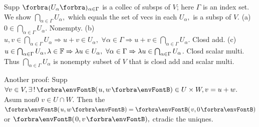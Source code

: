 Supp $\Bra{U_{\alpha}}{_{\alpha\in\Gamma}}$ is a collec of subsps of $V$; here $\Gamma$ is an index set.\vspace{2pt}\parSol{}
We show $\bigcap_{\alpha\in\Gamma}U_\alpha,$ which equals the set of vecs in each $U_\alpha,$ is a subsp of $V$.\vspace{2pt}\parSol{}
(a) $0\in\bigcap_{\alpha\in\Gamma}U_\alpha.$ Nonempty.\parSol{}
(b) $u,v\in\bigcap_{\alpha\in\Gamma}U_\alpha\Rightarrow u+v\in U_\alpha,\,\,\forall\alpha\in\Gamma\Rightarrow u+v\in\bigcap_{\alpha\in\Gamma}U_\alpha$. Closd add.\parSol{}
(c) $u\in\bigcap_{\alpha\in\Gamma}U_\alpha,\lambda\in{\mathbb{F}}\Rightarrow\lambda u\in U_\alpha,\,\,\forall\alpha\in\Gamma\Rightarrow\lambda u\in\bigcap_{\alpha\in\Gamma}U_\alpha$. Closd scalar multi.\vspace{4pt}\parSol{}
Thus $\bigcap_{\alpha\in\Gamma}U_\alpha$ is nonempty subset of $V$ that is closd add and scalar multi.\PfEnd
\SepLine\pagebreak

\BulletPointX\NoteForSmall{[1.45]}\;\;Another proof: Supp $\forall v\in V,\exists\,!\,\Par{u,w}\in U\times W,v=u+w.$\TextB{}
\Blind{\NoteForSmall{[1.45]}\;\;}Asum non0 $v\in U\cap W.$ Then the $\Par{u,w}=\Par{v,0}$ or $\Par{0,v},$ ctradic the uniqnes.\PfEnd\vspace{-2pt}
\SepLine

\SepLine



